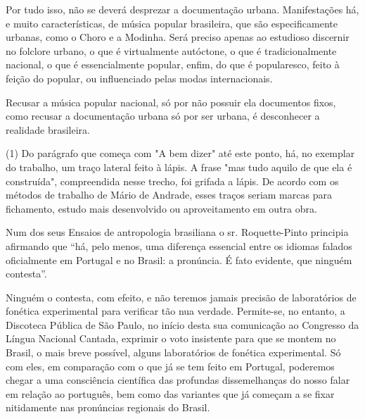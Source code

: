 Por tudo isso, não se deverá desprezar a documentação urbana.
Manifestações há, e muito características, de música popular brasileira,
que são especificamente urbanas, como o Choro e a Modinha. Será preciso
apenas ao estudioso discernir no folclore urbano, o que é virtualmente
autóctone, o que é tradicionalmente nacional, o que é essencialmente
popular, enfim, do que é popularesco, feito à feição do popular, ou
influenciado pelas modas internacionais.

Recusar a música popular nacional, só por não possuir ela documentos
fixos, como recusar a documentação urbana só por ser urbana, é
desconhecer a realidade brasileira.

(1) Do parágrafo que começa com "A bem dizer" até este ponto, há, no
exemplar do trabalho, um traço lateral feito à lápis. A frase "mas tudo
aquilo de que ela é construída", compreendida nesse trecho, foi grifada
a lápis. De acordo com os métodos de trabalho de Mário de Andrade, esses
traços seriam marcas para fichamento, estudo mais desenvolvido ou
aproveitamento em outra obra.




Num dos seus Ensaios de antropologia brasiliana o sr. Roquette-Pinto
principia afirmando que ``há, pelo menos, uma diferença essencial entre
os idiomas falados oficialmente em Portugal e no Brasil: a pronúncia. É
fato evidente, que ninguém contesta''.

Ninguém o contesta, com efeito, e não teremos jamais precisão de
laboratórios de fonética experimental para verificar tão nua verdade.
Permite-se, no entanto, a Discoteca Pública de São Paulo, no início
desta sua comunicação ao Congresso da Língua Nacional Cantada, exprimir
o voto insistente para que se montem no Brasil, o mais breve possível,
alguns laboratórios de fonética experimental. Só com eles, em comparação
com o que já se tem feito em Portugal, poderemos chegar a uma
consciência científica das profundas dissemelhanças do nosso falar em
relação ao português, bem como das variantes que já começam a se fixar
nitidamente nas pronúncias regionais do Brasil.


